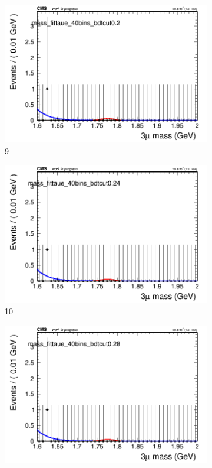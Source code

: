 \begin{figure}[h!]
\begin{subfigure}{0.2\textwidth}
        \includegraphics[width=\textwidth]{unfixed_exp/plots/taue/massfit_taue_40bins_bdtcut0.2.png}
        \caption{9}
    \end{subfigure}
    \begin{subfigure}{0.2\textwidth}
        \includegraphics[width=\textwidth]{unfixed_exp/plots/taue/massfit_taue_40bins_bdtcut0.24.png}
        \caption{10}
    \end{subfigure}
    \begin{subfigure}{0.2\textwidth}
        \includegraphics[width=\textwidth]{unfixed_exp/plots/taue/massfit_taue_40bins_bdtcut0.28.png}

\end{subfigure}
\end{figure}
